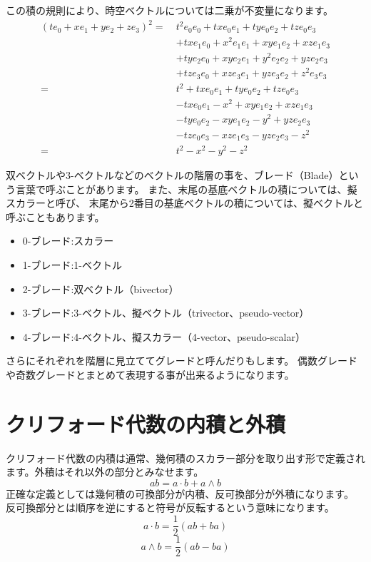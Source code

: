\documentclass[a4paper,12pt,notitlepage]{jsreport}
\begin{document}
この積の規則により、時空ベクトルについては二乗が不変量になります。
\begin{equation}
  \begin{split}
    (te_0+xe_1+ye_2+ze_3)^2=~&t^2e_0e_0+txe_0e_1+tye_0e_2+tze_0e_3\\
    &+txe_1e_0+x^2e_1e_1+xye_1e_2+xze_1e_3\\
    &+tye_2e_0+xye_2e_1+y^2e_2e_2+yze_2e_3\\
    &+tze_3e_0+xze_3e_1+yze_3e_2+z^2e_3e_3\\
    =~&t^2+txe_0e_1+tye_0e_2+tze_0e_3\\
    &-txe_0e_1-x^2+xye_1e_2+xze_1e_3\\
    &-tye_0e_2-xye_1e_2-y^2+yze_2e_3\\
    &-tze_0e_3-xze_1e_3-yze_2e_3-z^2\\
    =~&t^2-x^2-y^2-z^2
  \end{split}
\end{equation}

双ベクトルや3-ベクトルなどのベクトルの階層の事を、ブレード（Blade）という言葉で呼ぶことがあります。
また、末尾の基底ベクトルの積については、擬スカラーと呼び、
末尾から2番目の基底ベクトルの積については、擬ベクトルと呼ぶこともあります。
\begin{itemize}
  \item 0-ブレード:スカラー
  \item 1-ブレード:1-ベクトル
  \item 2-ブレード:双ベクトル（bivector）
  \item 3-ブレード:3-ベクトル、擬ベクトル（trivector、pseudo-vector）
  \item 4-ブレード:4-ベクトル、擬スカラー（4-vector、pseudo-scalar）
\end{itemize}
さらにそれぞれを階層に見立ててグレードと呼んだりもします。
偶数グレードや奇数グレードとまとめて表現する事が出来るようになります。

\section{クリフォード代数の内積と外積}

クリフォード代数の内積は通常、幾何積のスカラー部分を取り出す形で定義されます。外積はそれ以外の部分とみなせます。
\begin{equation}
  ab=a\cdot b+a\wedge b
\end{equation}
正確な定義としては幾何積の可換部分が内積、反可換部分が外積になります。
反可換部分とは順序を逆にすると符号が反転するという意味になります。
\begin{equation}
  a\cdot b=\frac{1}{2}(ab+ba)
\end{equation}
\begin{equation}
  a\wedge b=\frac{1}{2}(ab-ba)
\end{equation}
\end{document}
